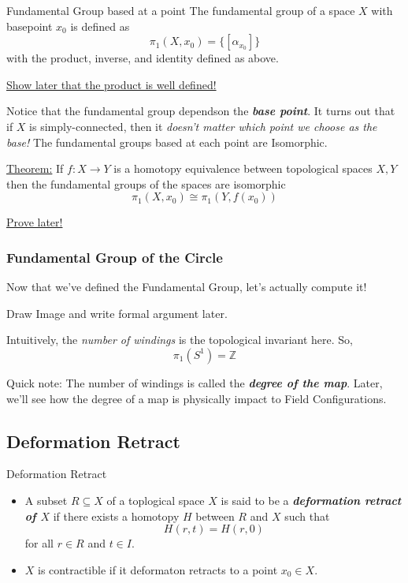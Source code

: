 \documentclass{article}
\begin{document}
\begin{mathdefinitionbox}{Fundamental Group based at a point}
  The fundamental group of a space $X$ with basepoint $x_0$ is defined as 
  \[ \pi_1(X, x_0) = \{ [\alpha_{x_0}] \} \]
  with the product, inverse, and identity defined as above.

  \vskip 0.25cm
  \underline{Show later that the product is well defined!}
\end{mathdefinitionbox}

Notice that the fundamental group dependson the \emph{\textbf{base point}}. It turns out that if $X$ is simply-connected, then it \emph{doesn't matter which point we choose as the base!} The fundamental groups based at each point are Isomorphic.


\begin{dottedbox}
  \underline{Theorem:} If $f : X \rightarrow Y$ is a homotopy equivalence between topological spaces $X, Y$ then the fundamental groups of the spaces are isomorphic
  \[ \pi_1(X, x_0) \cong \pi_1(Y, f(x_0)) \]

  \vskip 0.5cm
  \underline{Prove later!}
\end{dottedbox}


\vskip 1cm
\subsubsection{Fundamental Group of the Circle}
Now that we've defined the Fundamental Group, let's actually compute it!

\begin{dottedbox}
  Draw Image and write formal argument later.
  
  \vskip 0.5cm
  Intuitively, the \emph{number of windings} is the topological invariant here. So, 
  \[ \boxed{ \pi_1(S^1) = \mathbb{Z} } \]
\end{dottedbox}

\begin{dottedbox}
  Quick note: The number of windings is called the \emph{\textbf{degree of the map}}. Later, we'll see how the degree of a map is physically impact to Field Configurations.
\end{dottedbox}


\vskip 1cm
\subsection*{Deformation Retract}

\begin{mathdefinitionbox}{Deformation Retract}
  \begin{itemize}
    \item A subset $R \subseteq X$ of a toplogical space $X$ is said to be a \emph{\textbf{deformation retract of $X$}} if there exists a homotopy $H$ between $R$ and $X$ such that 
    \[ H(r, t) = H(r, 0) \]
    for all $r \in R$ and $t \in I$.
    \item $X$ is contractible if it deformaton retracts to a point $x_0 \in X$.
  \end{itemize}
\end{mathdefinitionbox}
\end{document}
